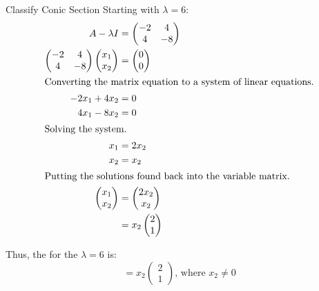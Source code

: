 \begin{example}{Classify Conic Section}
  Starting with $\lambda = 6$:
  \begin{align*}
    A - \lambda I &=
                    \begin{pmatrix}
                      -2 & 4 \\
                      4 & -8
                    \end{pmatrix} \\
    \begin{pmatrix}
      -2 & 4 \\
      4 & -8
    \end{pmatrix}
          \begin{pmatrix}
            x_{1} \\ x_{2}
          \end{pmatrix} &=
                          \begin{pmatrix}
                            0 \\ 0
                          \end{pmatrix} \\
    \intertext{Converting the matrix equation to a system of linear equations.}
    -2x_{1} + 4x_{2} &= 0 \\
    4x_{1} - 8x_{2} &= 0 \\
    \intertext{Solving the system.}
    x_{1} &= 2 x_{2} \\
    x_{2} &= x_{2} \\
    \intertext{Putting the solutions found back into the variable matrix.}
    \begin{pmatrix}
      x_{1} \\ x_{2}
    \end{pmatrix} &=
                    \begin{pmatrix}
                      2 x_{2} \\ x_{2}
                    \end{pmatrix} \\
    &= x_{2}
      \begin{pmatrix}
        2 \\ 1
      \end{pmatrix}
  \end{align*}

  Thus, the  for the  $\lambda = 6$ is:
  \begin{equation*}
    = x_{2}
    \begin{pmatrix}
      2 \\ 1
    \end{pmatrix}\text{, where } x_{2} \neq 0
  \end{equation*}


\end{example}
